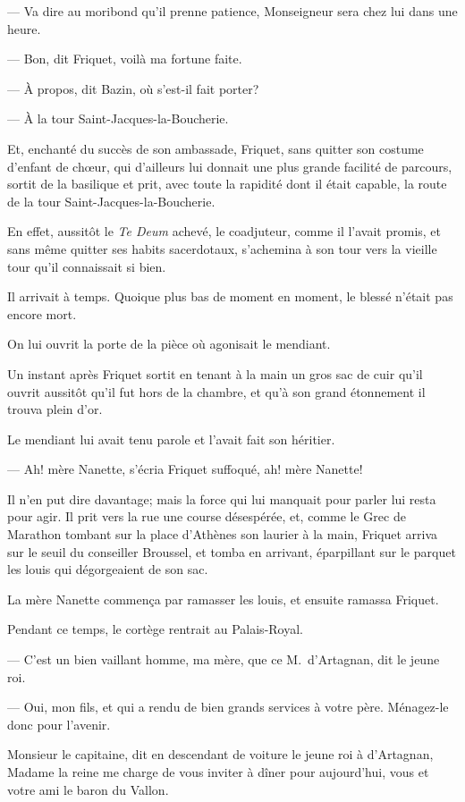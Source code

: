 — Va dire au moribond qu'il prenne patience, Monseigneur sera chez lui dans une heure.

— Bon, dit Friquet, voilà ma fortune faite.

— À propos, dit Bazin, où s'est-il fait porter?

— À la tour Saint-Jacques-la-Boucherie.

Et, enchanté du succès de son ambassade, Friquet, sans quitter son costume d'enfant de chœur, qui d'ailleurs lui donnait une plus grande facilité de parcours, sortit de la basilique et prit, avec toute la rapidité dont il était capable, la route de la tour Saint-Jacques-la-Boucherie.

En effet, aussitôt le \textit{Te Deum} achevé, le coadjuteur, comme il l'avait promis, et sans même quitter ses habits sacerdotaux, s'achemina à son tour vers la vieille tour qu'il connaissait si bien.

Il arrivait à temps. Quoique plus bas de moment en moment, le blessé n'était pas encore mort.

On lui ouvrit la porte de la pièce où agonisait le mendiant.

Un instant après Friquet sortit en tenant à la main un gros sac de cuir qu'il ouvrit aussitôt qu'il fut hors de la chambre, et qu'à son grand étonnement il trouva plein d'or.

Le mendiant lui avait tenu parole et l'avait fait son héritier.

— Ah! mère Nanette, s'écria Friquet suffoqué, ah! mère Nanette!

Il n'en put dire davantage; mais la force qui lui manquait pour parler lui resta pour agir. Il prit vers la rue une course désespérée, et, comme le Grec de Marathon tombant sur la place d'Athènes son laurier à la main, Friquet arriva sur le seuil du conseiller Broussel, et tomba en arrivant, éparpillant sur le parquet les louis qui dégorgeaient de son sac.

La mère Nanette commença par ramasser les louis, et ensuite ramassa Friquet.

Pendant ce temps, le cortège rentrait au Palais-Royal.

— C'est un bien vaillant homme, ma mère, que ce M.~d'Artagnan, dit le jeune roi.

— Oui, mon fils, et qui a rendu de bien grands services à votre père. Ménagez-le donc pour l'avenir.

Monsieur le capitaine, dit en descendant de voiture le jeune roi à d'Artagnan, Madame la reine me charge de vous inviter à dîner pour aujourd'hui, vous et votre ami le baron du Vallon.

